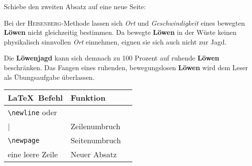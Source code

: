 \begin{frame}[fragile]
	\Aufgabee
	Schiebe den zweiten Absatz auf eine neue Seite:
	\begin{outputbox}
		Bei der \textsc{Heisenberg}-Methode lassen sich \textit{Ort} und \textit{Geschwindigkeit} eines bewegten \textbf{Löwen} nicht gleichzeitig bestimmen. Da bewegte \textbf{Löwen} in der Wüste keinen physikalisch sinnvollen \textit{Ort} einnehmen, eignen sie sich auch nicht zur Jagd. 
	\end{outputbox}
	\linebreakrule
	\begin{outputbox}
		Die \textbf{Löwenjagd} kann sich demnach zu 100 Prozent auf ruhende \textbf{Löwen} beschränken. Das Fangen eines ruhenden, bewegungslosen \textbf{Löwen} wird dem Leser als Übungsaufgabe überlassen.
	\end{outputbox}

	\btVFill\Befehle
	\begin{center}
		\begin{tabular}{lll}
			\toprule
			\LaTeX\ Befehl								&	Funktion			\\ \midrule
			\lstinline|\newline| oder \lstinline|\\|	&	Zeilenumbruch		\\
			\lstinline|\newpage|						&	Seitenumbruch		\\
			eine leere Zeile		&	Neuer Absatz		\\ \bottomrule
		\end{tabular}
	\end{center}
	\vspace{0.1cm}
\end{frame}
